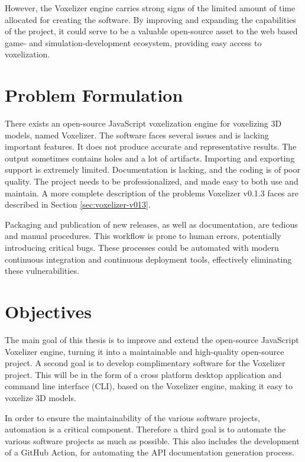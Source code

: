However, the Voxelizer engine carries strong signs of the limited amount of time allocated for creating the software. By improving and expanding the capabilities of the project, it could serve to be a valuable open-source asset to the web based game- and simulation-development ecosystem, providing easy access to voxelization.

\section{Problem Formulation}
There exists an open-source JavaScript voxelization engine for voxelizing 3D models, named Voxelizer. The software faces several issues and is lacking important features. It does not produce accurate and representative results. The output sometimes contains holes and a lot of artifacts. Importing and exporting support is extremely limited. Documentation is lacking, and the coding is of poor quality. The project needs to be professionalized, and made easy to both use and maintain. A more complete description of the problems Voxelizer v0.1.3 faces are described in Section \ref{sec:voxelizer-v013}.

Packaging and publication of new releases, as well as documentation, are tedious and manual procedures. This workflow is prone to human errors, potentially introducing critical bugs. These processes could be automated with modern continuous integration and continuous deployment tools, effectively eliminating these vulnerabilities.

\section{Objectives}
The main goal of this thesis is to improve and extend the open-source JavaScript Voxelizer engine, turning it into a maintainable and high-quality open-source project. A second goal is to develop complimentary software for the Voxelizer project. This will be in the form of a cross platform desktop application and command line interface (CLI), based on the Voxelizer engine, making it easy to voxelize 3D models.

In order to ensure the maintainability of the various software projects, automation is a critical component. Therefore a third goal is to automate the various software projects as much as possible. This also includes the development of a GitHub Action, for automating the API documentation generation process.

